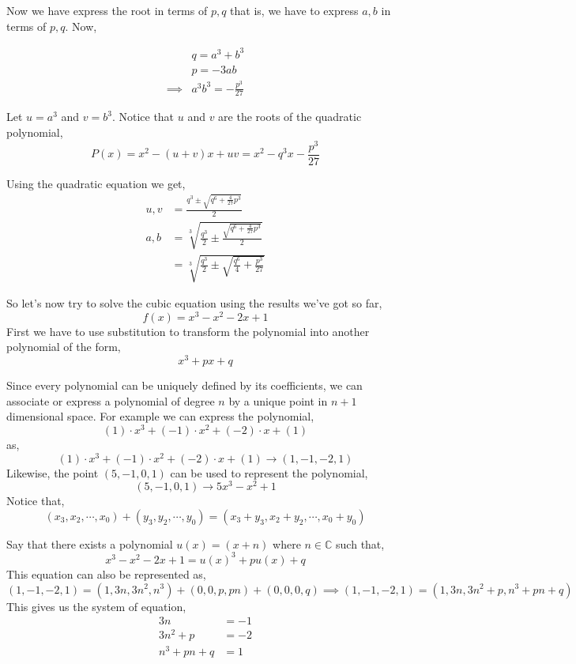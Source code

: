 \documentclass[11pt,numbers=noenddot,svgnames]{scrbook}
\begin{document}
Now we have express the root in terms of $p, q$ that is, we have to express $a,b$ in terms of $p,q$. Now,

\begin{align*}
         & q = a^{3} + b^{3} \\
         & p = -3ab \\
\implies & a^{3}b^{3} = -\frac{p^{3}}{27}
\end{align*}

Let $u=a^{3}$ and $v=b^{3}$. Notice that $u$ and $v$ are the roots of the quadratic polynomial,
\[
    P(x) = x^{2} - (u+v)x + uv = x^{2} - q^{3}x -\frac{p^{3}}{27} 
\]

Using the quadratic equation we get,
\begin{align*}
    u,v &= \frac{q^{3} \pm \sqrt{q^{6} + \frac{4}{27}p^{3}}}{2} \\
    a,b &= \sqrt[3]{\frac{q^{3}}{2} \pm \frac{\sqrt{q^{6} + \frac{4}{27}p^{3}}}{2}}\\
        &= \sqrt[3]{\frac{q^{3}}{2} \pm \sqrt{\frac{q^{6}}{4} + \frac{p^{3}}{27}}}
\end{align*}

So let's now try to solve the cubic equation using the results we've got so far,
\[
    f(x) = x^{3} - x^{2} - 2x + 1
\]
First we have to use substitution to transform the polynomial into another polynomial of the form,
\[
    x^{3} + px + q
\]

Since every polynomial can be uniquely defined by its coefficients, we can associate or 
express a polynomial of degree $n$ by a unique point in $n+1$ dimensional space. 
For example we can express the polynomial,
\[
    (1) \cdot x^{3} + (-1) \cdot x^{2} + (-2) \cdot x + (1)
\]
as,
\[
    (1) \cdot x^{3} + (-1) \cdot x^{2} + (-2) \cdot x + (1) \rightarrow (1, -1, -2, 1)
\]
Likewise, the point $(5, -1, 0, 1)$ can be used to represent the polynomial,
\[
    (5, -1, 0, 1) \rightarrow 5x^{3} -x^{2} + 1
\]
Notice that,
\[
    (x_{3}, x_{2}, \cdots, x_{0}) + (y_{3}, y_{2}, \cdots, y_{0}) = (x_{3} + y_{3}, x_{2} + y_{2}, \cdots, x_{0} + y_{0})
\]

Say that there exists a polynomial $u(x) = (x+n)$ where $n \in \mathbb{C}$ such that,
\[
    x^{3} - x^{2} -2x + 1 = u(x)^{3} + pu(x) + q
\]
This equation can also be represented as,
\[
    (1, -1, -2, 1) = (1, 3n, 3n^{2}, n^{3}) + (0, 0, p, pn) + (0,0,0,q) \implies (1, -1, -2, 1) = (1, 3n, 3n^{2}+p, n^{3}+ pn + q)
\]
This gives us the system of equation,
\begin{align*}
   3n              &= -1 \\
   3n^{2} + p      &= -2 \\
    n^{3} + pn + q &= 1
\end{align*}
\end{document}
